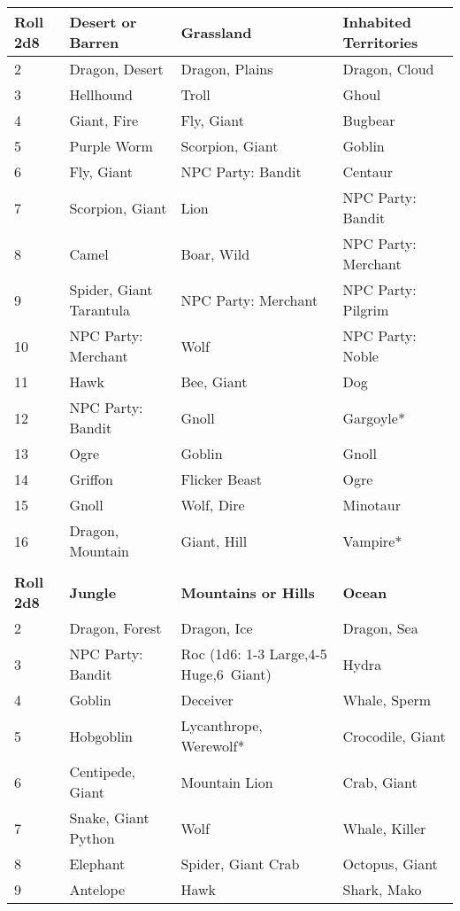 \documentclass[a4paper,twoside,openany,10pt]{book}
\begin{document}
\begin{tabular*}{1\linewidth}{@{\extracolsep{\fill}}llll}

\textbf{Roll 2d8} & \textbf{Desert or Barren} & \textbf{Grassland} & \textbf{Inhabited Territories} \\\toprule
2 & Dragon, Desert & Dragon, Plains & Dragon, Cloud \\\hline
3 & Hellhound & Troll & Ghoul \\\hline
4 & Giant, Fire & Fly, Giant & Bugbear \\\hline
5 & Purple Worm & Scorpion, Giant & Goblin \\\hline
6 & Fly, Giant & NPC Party: Bandit & Centaur \\\hline
7 & Scorpion, Giant & Lion & NPC Party: Bandit \\\hline
8 & Camel & Boar, Wild & NPC Party: Merchant \\\hline
9 & Spider, Giant Tarantula & NPC Party: Merchant & NPC Party:
Pilgrim \\\hline
10 & NPC Party: Merchant & Wolf & NPC Party: Noble \\\hline
11 & Hawk & Bee, Giant & Dog \\\hline
12 & NPC Party: Bandit & Gnoll & Gargoyle* \\\hline
13 & Ogre & Goblin & Gnoll \\\hline
14 & Griffon & Flicker Beast & Ogre \\\hline
15 & Gnoll & Wolf, Dire & Minotaur \\\hline
16 & Dragon, Mountain & Giant, Hill & Vampire* \\\hline
& & & \\\hline
\textbf{Roll 2d8} & \textbf{Jungle} & \textbf{Mountains or Hills} & \textbf{Ocean} \\\hline
2 & Dragon, Forest & Dragon, Ice & Dragon, Sea \\\hline
3 & NPC Party: Bandit & Roc (1d6: 1-3 Large,4-5 Huge,6~Giant) & Hydra \\\hline
4 & Goblin & Deceiver & Whale, Sperm \\\hline
5 & Hobgoblin & Lycanthrope, Werewolf* & Crocodile, Giant \\\hline
6 & Centipede, Giant & Mountain Lion & Crab, Giant \\\hline
7 & Snake, Giant Python & Wolf & Whale, Killer \\\hline
8 & Elephant & Spider, Giant Crab & Octopus, Giant \\\hline
9 & Antelope & Hawk & Shark, Mako \\\hline

\end{tabular*}
\end{document}
